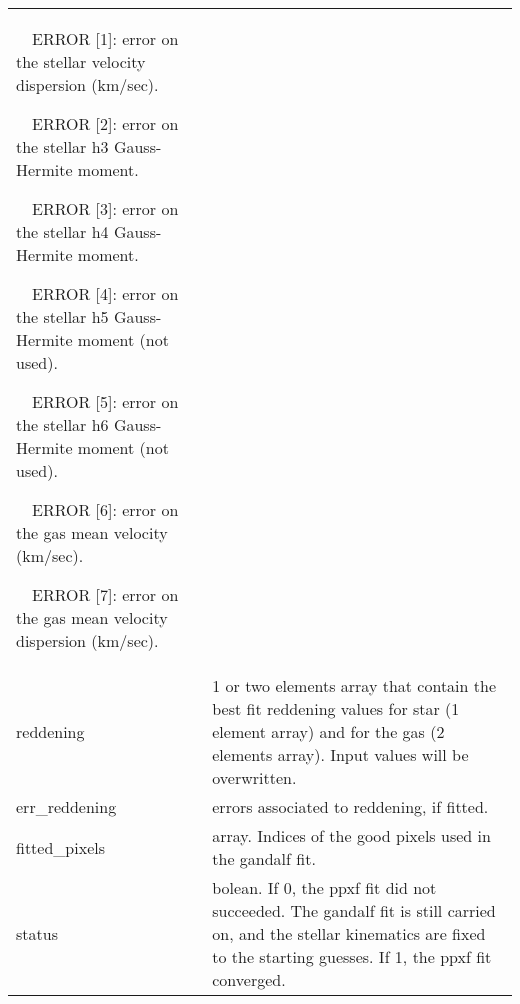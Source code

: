 \begin{center}
\begin{longtable}{p{2.7cm}| p{11.1cm}}
       \ \ ERROR [1]: error on the stellar velocity dispersion  (km/sec).

       \ \ ERROR [2]: error on the stellar h3 Gauss-Hermite moment.

       \ \ ERROR [3]: error on the stellar h4 Gauss-Hermite moment.

       \ \ ERROR [4]: error on the stellar h5 Gauss-Hermite moment (not used).

       \ \ ERROR [5]: error on the stellar h6 Gauss-Hermite moment (not used).

       \ \ ERROR [6]: error on the gas mean velocity (km/sec).

       \ \ ERROR [7]: error on the gas mean velocity dispersion (km/sec).  \\
%
reddening   & 1 or two elements array that contain the best fit reddening values 
            for star (1 element array) and for the gas (2 elements array). Input values will be overwritten.\\
%
err\_reddening & errors associated to reddening, if fitted.\\
%
fitted\_pixels &  array. Indices of the good pixels used in the gandalf fit.\\
%
status & bolean. If 0, the ppxf fit did not succeeded. The gandalf  fit is still carried on, and the stellar 
        kinematics are fixed to the starting guesses. If 1, the ppxf fit converged.\\
\hline
\hline
\end{longtable}
\end{center}
